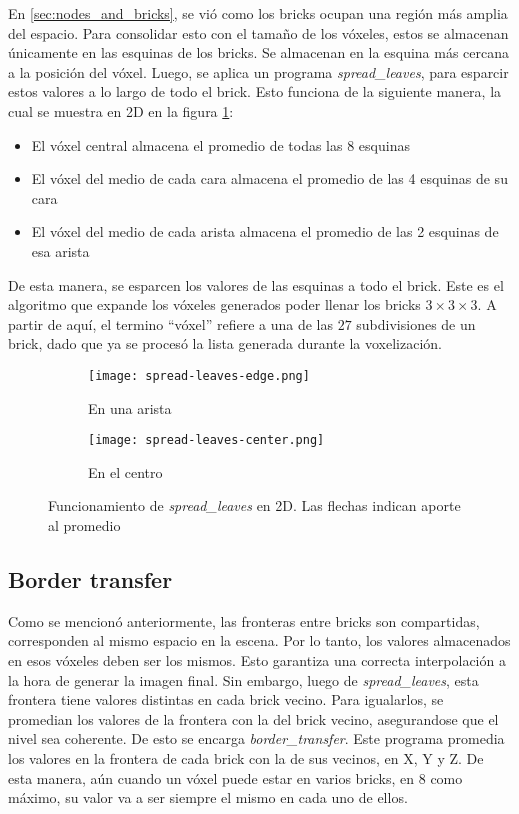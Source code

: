 En \ref{sec:nodes_and_bricks}, se vió como los bricks ocupan una región más amplia del espacio.
Para consolidar esto con el tamaño de los vóxeles, estos se almacenan únicamente en las esquinas de los bricks.
Se almacenan en la esquina más cercana a la posición del vóxel.
Luego, se aplica un programa \textit{spread\_leaves}, para esparcir estos valores a lo largo de todo el brick.
Esto funciona de la siguiente manera, la cual se muestra en 2D en la figura \ref{fig:spread-leaves}:
\begin{itemize}
    \item El vóxel central almacena el promedio de todas las 8 esquinas
    \item El vóxel del medio de cada cara almacena el promedio de las 4 esquinas de su cara
    \item El vóxel del medio de cada arista almacena el promedio de las 2 esquinas de esa arista
\end{itemize}
De esta manera, se esparcen los valores de las esquinas a todo el brick.
Este es el algoritmo que expande los vóxeles generados poder llenar los bricks $3\times3\times3$.
A partir de aquí, el termino ``vóxel'' refiere a una de las $27$ subdivisiones de un brick, dado que ya se procesó la lista generada durante la voxelización.

\begin{figure}
    \begin{subfigure}{.5\textwidth}
        \centering
        \texttt{[image: spread-leaves-edge.png]}
        \caption{En una arista}
    \end{subfigure}
    \begin{subfigure}{.5\textwidth}
        \centering
        \texttt{[image: spread-leaves-center.png]}
        \caption{En el centro}
    \end{subfigure}
    \caption{Funcionamiento de \textit{spread\_leaves} en 2D. Las flechas indican aporte al promedio}
    \label{fig:spread-leaves}
\end{figure}

\subsection{Border transfer}\label{sec:border_transfer}

Como se mencionó anteriormente, las fronteras entre bricks son compartidas, corresponden al mismo espacio en la escena.
Por lo tanto, los valores almacenados en esos vóxeles deben ser los mismos.
Esto garantiza una correcta interpolación a la hora de generar la imagen final.
Sin embargo, luego de \textit{spread\_leaves}, esta frontera tiene valores distintas en cada brick vecino.
Para igualarlos, se promedian los valores de la frontera con la del brick vecino, asegurandose que el nivel sea coherente.
De esto se encarga \textit{border\_transfer}.
Este programa promedia los valores en la frontera de cada brick con la de sus vecinos, en X, Y y Z.
De esta manera, aún cuando un vóxel puede estar en varios bricks, en $8$ como máximo, su valor va a ser siempre el mismo en cada uno de ellos.

